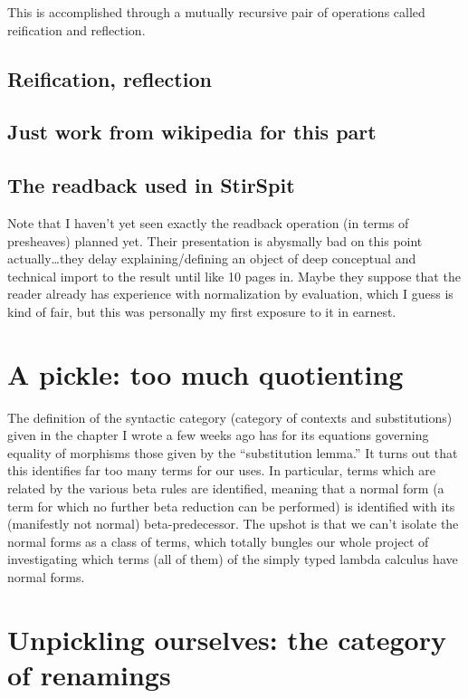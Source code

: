 \documentclass[11pt]{article}
\begin{document}
This is accomplished
through a mutually recursive pair of operations called reification and
reflection.
\subsection{Reification, reflection}
\label{sec:org43081b6}


\subsection{Just work from wikipedia for this part}
\label{sec:org3258be1}

\subsection{The readback used in StirSpit}
\label{sec:org7b3c6f8}
Note that I haven't yet seen exactly the readback operation (in terms of
presheaves) planned yet. Their presentation is abysmally bad on this point
actually\ldots{}they delay explaining/defining an object of deep conceptual and
technical import to the result until like 10 pages in. Maybe they suppose that
the reader already has experience with normalization by evaluation, which I
guess is kind of fair, but this was personally my first exposure to it in
earnest.

\section{A pickle: too much quotienting}
\label{sec:orgc2f5300}
The definition of the syntactic category (category of contexts and
substitutions) given in the chapter I wrote a few weeks ago has for its
equations governing equality of morphisms those given by the ``substitution
lemma.'' It turns out that this identifies far too many terms for our uses. In
particular, terms which are related by the various beta rules are identified,
meaning that a normal form (a term for which no further beta reduction can be
performed) is identified with its (manifestly not normal) beta-predecessor. The
upshot is that we can't isolate the normal forms as a class of terms, which
totally bungles our whole project of investigating which terms (all of them) of
the simply typed lambda calculus have normal forms.

\section{Unpickling ourselves: the category of renamings}
\label{sec:org6815046}
\end{document}
